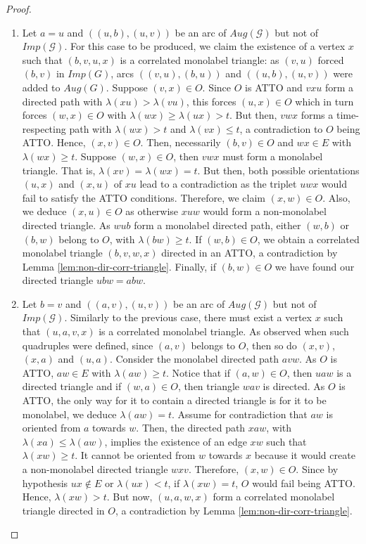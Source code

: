 \documentclass[runningheads]{llncs}
\begin{document}
\begin{proof}
\begin{enumerate}[label=\roman*)]
\vspace{1ex}

\item Let $a=u$ and $((u,b),(u,v))$ be an arc of $Aug(\mathcal{G})$ but not of $Imp(\mathcal{G})$. For this case to be produced, we claim the existence of a vertex $x$ such that $(b,v,u,x)$ is a correlated monolabel triangle: as $(v,u)$ forced $(b,v)$ in $Imp(G)$, arcs $((v,u),(b,u))$ and $((u,b),(u,v))$ were added to $Aug(G)$. Suppose $(v,x) \in O$. Since $O$ is ATTO and $vxu$ form a directed path with $\lambda(xu) > \lambda(vu)$, this forces $(u,x) \in O$ which in turn forces $(w,x) \in O$ with $\lambda(wx) \geq \lambda(ux) > t$. But then, $vwx$ forms a time-respecting path with $\lambda(wx) > t$ and $\lambda(vx) \leq t$, a contradiction to $O$ being ATTO. Hence, $(x,v) \in O$. Then, necessarily $(b,v)\in O$ and $wx \in E$ with $\lambda(wx) \geq t$. Suppose $(w,x) \in O$, then $vwx$ must form a monolabel triangle. That is, $\lambda(xv) = \lambda(wx) = t$. But then, both possible orientations $(u,x)$ and $(x,u)$ of $xu$ lead to a contradiction as the triplet $uwx$ would fail to satisfy the ATTO conditions. Therefore, we claim $(x,w) \in O$. Also, we deduce $(x,u) \in O$ as otherwise $xuw$ would form a non-monolabel directed triangle. As $wub$ form a monolabel directed path, either $(w,b)$ or $(b,w)$ belong to $O$, with $\lambda(bw) \geq t$. If $(w,b) \in O$, we obtain a correlated monolabel triangle $(b,v,w,x)$ directed in an ATTO, a contradiction by Lemma \ref{lem:non-dir-corr-triangle}. Finally, if $(b,w) \in O$ we have found our directed triangle $ubw = abw$.

\vspace{1ex}

\item Let $b=v$ and $((a,v),(u,v))$ be an arc of $Aug(\mathcal{G})$ but not of $Imp(\mathcal{G})$. Similarly to the previous case, there must exist a vertex $x$ such that $(u,a,v,x)$ is a correlated monolabel triangle. As observed when such quadruples were defined, since $(a,v)$ belongs to $O$, then so do $(x,v)$, $(x,a)$ and $(u,a)$. Consider the monolabel directed path $avw$. As $O$ is ATTO, $aw \in E$ with $\lambda(aw) \geq t$. Notice that if $(a,w) \in O$, then $uaw$ is a directed triangle and if $(w,a) \in O$, then triangle $wav$ is directed. As $O$ is ATTO, the only way for it to contain a directed triangle is for it to be monolabel, we deduce $\lambda(aw) =t$. Assume for contradiction that $aw$ is oriented from $a$ towards $w$. Then, the directed path $xaw$, with $\lambda(xa) \leq \lambda(aw)$, implies the existence of an edge $xw$ such that $\lambda(xw) \geq t$. It cannot be oriented from $w$ towards $x$ because it would create a non-monolabel directed triangle $wxv$. Therefore, $(x,w)\in O$. Since by hypothesis $ux \notin E$ or $\lambda(ux) < t$, if $\lambda(xw) = t$, $O$ would fail being ATTO. Hence, $\lambda(xw) > t$. But now, $(u,a,w,x)$ form a correlated monolabel triangle directed in $O$, a contradiction by Lemma \ref{lem:non-dir-corr-triangle}.
\end{enumerate}
\end{proof}
\end{document}
